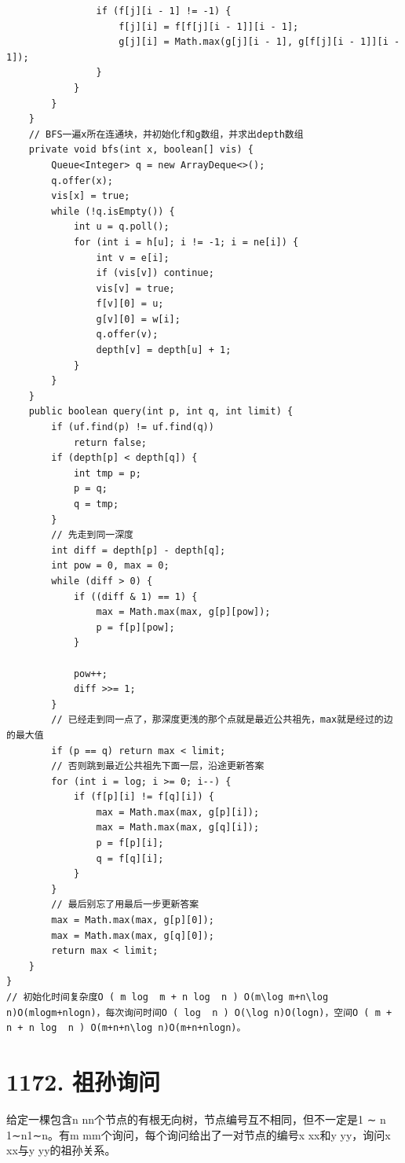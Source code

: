 \documentclass[9pt, b5paaper]{book}
\begin{document}
\begin{verbatim}
                if (f[j][i - 1] != -1) {
                    f[j][i] = f[f[j][i - 1]][i - 1];
                    g[j][i] = Math.max(g[j][i - 1], g[f[j][i - 1]][i - 1]);
                }
            }
        }
    }
    // BFS一遍x所在连通块，并初始化f和g数组，并求出depth数组
    private void bfs(int x, boolean[] vis) {
        Queue<Integer> q = new ArrayDeque<>();
        q.offer(x);
        vis[x] = true;
        while (!q.isEmpty()) {
            int u = q.poll();
            for (int i = h[u]; i != -1; i = ne[i]) {
                int v = e[i];
                if (vis[v]) continue;
                vis[v] = true;
                f[v][0] = u;
                g[v][0] = w[i];
                q.offer(v);
                depth[v] = depth[u] + 1;
            }
        }
    }
    public boolean query(int p, int q, int limit) {
        if (uf.find(p) != uf.find(q)) 
            return false;
        if (depth[p] < depth[q]) {
            int tmp = p;
            p = q;
            q = tmp;
        }
        // 先走到同一深度
        int diff = depth[p] - depth[q];
        int pow = 0, max = 0;
        while (diff > 0) {
            if ((diff & 1) == 1) {
                max = Math.max(max, g[p][pow]);
                p = f[p][pow];
            }

            pow++;
            diff >>= 1;
        }
        // 已经走到同一点了，那深度更浅的那个点就是最近公共祖先，max就是经过的边的最大值
        if (p == q) return max < limit;
        // 否则跳到最近公共祖先下面一层，沿途更新答案
        for (int i = log; i >= 0; i--) {
            if (f[p][i] != f[q][i]) {
                max = Math.max(max, g[p][i]);
                max = Math.max(max, g[q][i]);
                p = f[p][i];
                q = f[q][i];
            }
        }
        // 最后别忘了用最后一步更新答案
        max = Math.max(max, g[p][0]);
        max = Math.max(max, g[q][0]);
        return max < limit;
    }
}
// 初始化时间复杂度O ( m log ⁡ m + n log ⁡ n ) O(m\log m+n\log n)O(mlogm+nlogn)，每次询问时间O ( log ⁡ n ) O(\log n)O(logn)，空间O ( m + n + n log ⁡ n ) O(m+n+n\log n)O(m+n+nlogn)。
\end{verbatim}

\section{1172. 祖孙询问}
\label{sec-17-8}
给定一棵包含n nn个节点的有根无向树，节点编号互不相同，但不一定是1 ∼ n 1∼n1∼n。有m mm个询问，每个询问给出了一对节点的编号x xx和y yy，询问x xx与y yy的祖孙关系。
\end{document}
